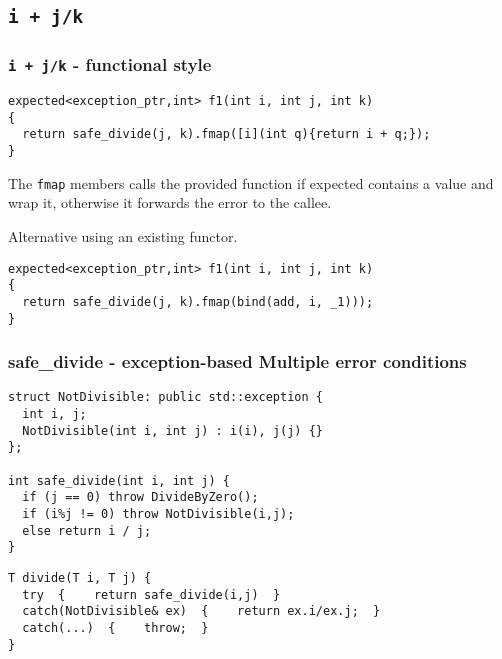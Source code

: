 \documentclass[xcolor=dvipsnames]{beamer}
\newcommand{\cpp}[1]{\lstinline{#1}}
\begin{document}
\subsection{\cpp{i + j/k}}
\begin{frame}[fragile]
\frametitle{\cpp{i + j/k}  - functional style}

\begin{lstlisting}
expected<exception_ptr,int> f1(int i, int j, int k)
{
  return safe_divide(j, k).fmap([i](int q){return i + q;});
}
\end{lstlisting}

The \cpp{fmap} members calls the provided function if expected contains a value and wrap it, otherwise it forwards the error to the callee. 

Alternative using an existing functor.

\begin{lstlisting}
expected<exception_ptr,int> f1(int i, int j, int k)
{
  return safe_divide(j, k).fmap(bind(add, i, _1)));
}
\end{lstlisting}
\end{frame}
\begin{frame}[fragile]
\frametitle{safe\_divide  - exception-based Multiple error conditions}

\begin{lstlisting}
struct NotDivisible: public std::exception {
  int i, j;
  NotDivisible(int i, int j) : i(i), j(j) {}
};

int safe_divide(int i, int j) {
  if (j == 0) throw DivideByZero(); 
  if (i%j != 0) throw NotDivisible(i,j);
  else return i / j; 
}
\end{lstlisting}

\begin{lstlisting}
T divide(T i, T j) {
  try  {    return safe_divide(i,j)  }
  catch(NotDivisible& ex)  {    return ex.i/ex.j;  }
  catch(...)  {    throw;  }
}
\end{lstlisting}
\end{frame}
\end{document}
